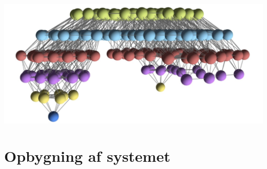 \documentclass[smaller,handouts]{beamer}
\begin{document}
\begin{frame}
\begin{center}
  \includegraphics[scale=0.2]{landscape1.jpg}
  \end{center} 
\end{frame}
%   






\section{Opbygning af systemet}
\end{document}
